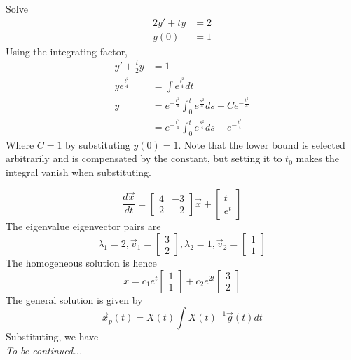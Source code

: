 \documentclass[12pt]{article}
\begin{document}
\begin{ex}
	Solve
	\begin{align*}
		2y' + ty &= 2 \\
		y(0) &= 1
	\end{align*}
	Using the integrating factor,
	\begin{align*}
		y' + \frac{t}{2}y &= 1 \\
		ye^{\frac{t^2}{4}} &= \int e^{\frac{t^2}{4}}dt \\
		y &= e^{-\frac{t^2}{4}}\int_0^t e^{\frac{s^2}{4}}ds + Ce^{-\frac{t^2}{4}} \\
		  &= e^{-\frac{t^2}{4}}\int_0^t e^{\frac{s^2}{4}}ds + e^{-\frac{t^2}{4}}
	\end{align*}
	Where $C = 1$ by substituting $y(0) = 1$. Note that the lower bound is selected arbitrarily and is compensated by the constant, but setting it to $t_0$ makes the integral vanish when substituting.
\end{ex}

\begin{ex}
	$$\frac{d\vec{x}}{dt} = \begin{bmatrix} 4 & -3 \\ 2 & -2\end{bmatrix} \vec{x} + \begin{bmatrix} t \\ e^t\end{bmatrix}$$
	The eigenvalue eigenvector pairs are
	$$\lambda_1 = 2, \vec{v}_1 = \begin{bmatrix} 3 \\ 2\end{bmatrix}, \lambda_2 = 1, \vec{v}_2 = \begin{bmatrix} 1 \\ 1\end{bmatrix}$$
	The homogeneous solution is hence
	$$x = c_1e^t\begin{bmatrix} 1 \\ 1\end{bmatrix} + c_2e^{2t}\begin{bmatrix} 3 \\ 2\end{bmatrix}$$
	The general solution is given by
	$$\vec{x}_p(t) = X(t)\int X(t)^{-1}\vec{g}(t)dt$$
	Substituting, we have \\
	\textit{To be continued...}
\end{ex}
\end{document}
